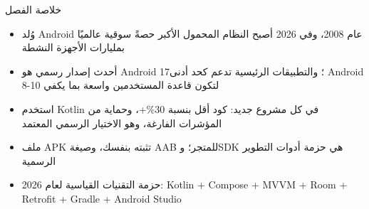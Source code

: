 \begin{tcbsummary}{خلاصة الفصل}
\begin{itemize}
  \item وُلد Android عام 2008، وفي 2026 أصبح النظام المحمول الأكبر حصةً سوقية عالميًا بمليارات الأجهزة النشطة
  \item أحدث إصدار رسمي هو Android 17؛ والتطبيقات الرئيسية تدعم كحد أدنى Android 8-10 لتكون قاعدة المستخدمين واسعة بما يكفي
  \item استخدم Kotlin في كل مشروع جديد: كود أقل بنسبة 30\%+، وحماية من المؤشرات الفارغة، وهو الاختيار الرسمي المعتمد
  \item ملف APK تثبته بنفسك، وصيغة AAB للمتجر؛ وSDK هي حزمة أدوات التطوير الرسمية
  \item حزمة التقنيات القياسية لعام 2026: Kotlin + Compose + MVVM + Room + Retrofit + Gradle + Android Studio
\end{itemize}

\end{tcbsummary}
